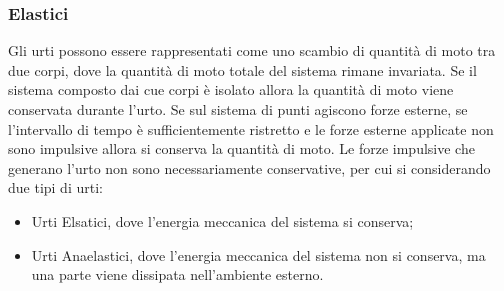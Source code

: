 \documentclass{article}
\numberwithin{equation}{subsection}
\begin{document}
\subsubsection{Elastici}
Gli urti possono essere rappresentati come uno scambio di quantità di moto tra due corpi, dove la quantità di moto totale del sistema rimane invariata. 
Se il sistema composto dai cue corpi è isolato allora la quantità di 
moto viene conservata durante l'urto. Se sul sistema di punti agiscono forze esterne, se l'intervallo di tempo è sufficientemente ristretto e le forze esterne applicate 
non sono impulsive allora si conserva la quantità di moto. Le forze impulsive che generano l'urto non sono necessariamente conservative, per cui si considerando 
due tipi di urti: 
\begin{itemize}
    \item Urti Elsatici, dove l'energia meccanica del sistema si conserva;
    \item Urti Anaelastici, dove l'energia meccanica del sistema non si conserva, ma una parte viene dissipata nell'ambiente esterno.
\end{itemize}
\end{document}
